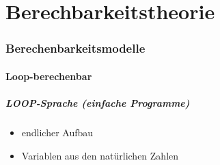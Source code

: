 \documentclass{lehramt-informatik-haupt}
\begin{document}

\chapter{Berechbarkeitstheorie}

\begin{liQuellen}
\item \cite[Seite 253-340]{hoffmann}
\end{liQuellen}

\subsection{Berechenbarkeitsmodelle}

%


\subsubsection{Loop-berechenbar}

\begin{liQuellen}
\item \cite[Seite 7-11]{theo:fs:4}
\item \cite[Seite 254-260]{hoffmann}
\item \cite{wiki:loop}
\end{liQuellen}

\paragraph{LOOP-Sprache (einfache Programme)}

\begin{itemize}
\item endlicher Aufbau
\item Variablen aus den natürlichen Zahlen
\end{itemize}
\end{document}
